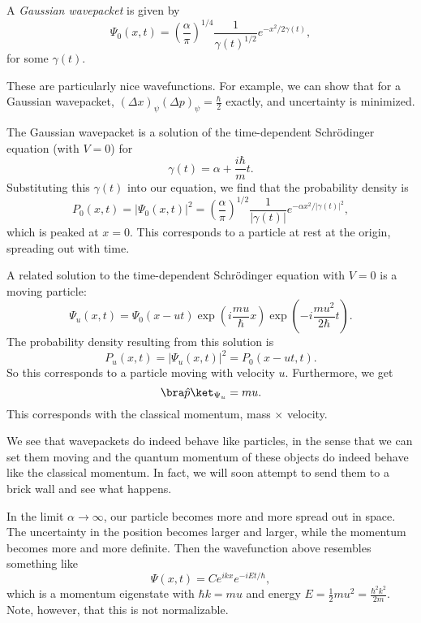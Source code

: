 \documentclass[a4paper]{article}
\begin{document}
\begin{defi}
 A \emph{Gaussian wavepacket} is given by
 \[
   \Psi_0(x, t) = \left(\frac{\alpha}{\pi}\right)^{1/4} \frac{1}{\gamma(t)^{1/2}} e^{-x^2/2\gamma(t)},
 \]
for some $\gamma(t)$.
\end{defi}
These are particularly nice wavefunctions. For example, we can show that for a Gaussian wavepacket, $(\Delta x)_\psi (\Delta p)_\psi = \frac{\hbar}{2}$ exactly, and uncertainty is minimized.

The Gaussian wavepacket is a solution of the time-dependent Schr\"odinger equation (with $V = 0$) for
\[
  \gamma(t) = \alpha + \frac{i\hbar}{m} t.
\]
Substituting this $\gamma(t)$ into our equation, we find that the probability density is
\[
  P_0(x, t) = |\Psi_0(x, t)|^2 = \left(\frac{\alpha}{\pi}\right)^{1/2} \frac{1}{|\gamma(t)|} e^{-\alpha x^2/|\gamma(t)|^2},
\]
which is peaked at $x = 0$. This corresponds to a particle at rest at the origin, spreading out with time.

A related solution to the time-dependent Schr\"odinger equation with $V = 0$ is a moving particle:
\[
  \Psi_u(x, t) = \Psi_0(x - ut) \exp\left(i\frac{mu}{\hbar} x\right) \exp\left(-i \frac{mu^2}{2\hbar}t\right).
\]
The probability density resulting from this solution is
\[
  P_u(x, t) = |\Psi_u(x, t)|^2 = P_0(x - ut, t).
\]
So this corresponds to a particle moving with velocity $u$. Furthermore, we get
\[
  \bra \hat{p}\ket_{\Psi_u} = mu.
\]
This corresponds with the classical momentum, mass $\times$ velocity.

We see that wavepackets do indeed behave like particles, in the sense that we can set them moving and the quantum momentum of these objects do indeed behave like the classical momentum. In fact, we will soon attempt to send them to a brick wall and see what happens.

In the limit $\alpha \to \infty$, our particle becomes more and more spread out in space. The uncertainty in the position becomes larger and larger, while the momentum becomes more and more definite. Then the wavefunction above resembles something like
\[
  \Psi(x, t) = Ce^{ikx}e^{-iEt/\hbar},
\]
which is a momentum eigenstate with $\hbar k = mu$ and energy $E = \frac{1}{2}mu^2 = \frac{\hbar^2 k^2}{2m}$. Note, however, that this is not normalizable.
\end{document}

